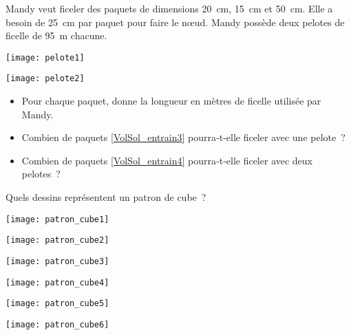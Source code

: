 \begin{exercice}[Paquets]
Mandy veut ficeler des paquets de dimensions 20 cm, 15 cm et 50 cm. Elle a besoin de 25 cm par paquet pour faire le nœud. Mandy possède deux pelotes de ficelle de 95 m chacune.
\begin{colenumerate}{2}
 \item
 
 \texttt{[image: pelote1]} \label{VolSol_entrain3}
 \item
 
 \texttt{[image: pelote2]} \label{VolSol_entrain4}
 \end{colenumerate}
\begin{itemize}
 \item Pour chaque paquet, donne la longueur en mètres de ficelle utilisée par Mandy.
 \item Combien de paquets \ref{VolSol_entrain3} pourra‑t‑elle ficeler avec une pelote ?
 \item Combien de paquets \ref{VolSol_entrain4} pourra‑t‑elle ficeler avec deux pelotes ?
 \end{itemize}
\end{exercice}


\newpage



\begin{exercice}
Quels dessins représentent un patron de cube ? 
\begin{colenumerate}{3}
 \item
 
 \texttt{[image: patron\_cube1]}
 \item
 
 \texttt{[image: patron\_cube2]}
 \item
 
 \texttt{[image: patron\_cube3]}
 \item
 
 \texttt{[image: patron\_cube4]}
 \item
 
 \texttt{[image: patron\_cube5]}
 \item
 
 \texttt{[image: patron\_cube6]}
 \end{colenumerate}
\end{exercice}


